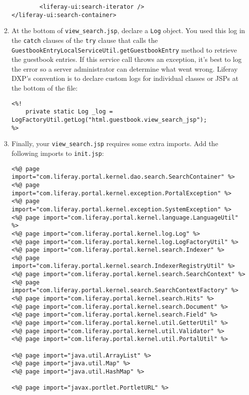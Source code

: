\begin{enumerate}
\begin{verbatim}
        <liferay-ui:search-iterator />
</liferay-ui:search-container>
\end{verbatim}
\item
  At the bottom of \texttt{view\_search.jsp}, declare a \texttt{Log}
  object. You used this log in the \texttt{catch} clauses of the
  \texttt{try} clause that calls the
  \texttt{GuestbookEntryLocalServiceUtil.getGuestbookEntry} method to
  retrieve the guestbook entries. If this service call throws an
  exception, it's best to log the error so a server administrator can
  determine what went wrong. Liferay DXP's convention is to declare
  custom logs for individual classes or JSPs at the bottom of the file:

\begin{verbatim}
<%!
    private static Log _log = LogFactoryUtil.getLog("html.guestbook.view_search_jsp");
%>
\end{verbatim}
\item
  Finally, your \texttt{view\_search.jsp} requires some extra imports.
  Add the following imports to \texttt{init.jsp}:

\begin{verbatim}
<%@ page import="com.liferay.portal.kernel.dao.search.SearchContainer" %>
<%@ page import="com.liferay.portal.kernel.exception.PortalException" %>
<%@ page import="com.liferay.portal.kernel.exception.SystemException" %>
<%@ page import="com.liferay.portal.kernel.language.LanguageUtil" %>
<%@ page import="com.liferay.portal.kernel.log.Log" %>
<%@ page import="com.liferay.portal.kernel.log.LogFactoryUtil" %>
<%@ page import="com.liferay.portal.kernel.search.Indexer" %>
<%@ page import="com.liferay.portal.kernel.search.IndexerRegistryUtil" %>
<%@ page import="com.liferay.portal.kernel.search.SearchContext" %>
<%@ page import="com.liferay.portal.kernel.search.SearchContextFactory" %>
<%@ page import="com.liferay.portal.kernel.search.Hits" %>
<%@ page import="com.liferay.portal.kernel.search.Document" %>
<%@ page import="com.liferay.portal.kernel.search.Field" %>
<%@ page import="com.liferay.portal.kernel.util.GetterUtil" %>
<%@ page import="com.liferay.portal.kernel.util.Validator" %>
<%@ page import="com.liferay.portal.kernel.util.PortalUtil" %>

<%@ page import="java.util.ArrayList" %>
<%@ page import="java.util.Map" %>
<%@ page import="java.util.HashMap" %>

<%@ page import="javax.portlet.PortletURL" %>
\end{verbatim}
\end{enumerate}

